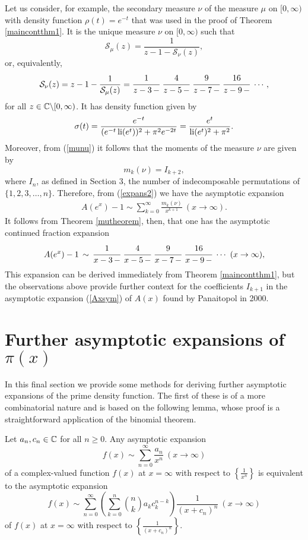 \documentclass[12pt]{article}
\begin{document}
Let us consider, for example, the secondary measure $\nu$ of the measure $\mu$ on $[0,\infty)$ with density function $\rho(t) = e^{-t}$ that was used in the proof of Theorem \ref{maincontthm1}.  It is the unique measure $\nu$ on $[0,\infty)$ such that
$${\mathcal S}_\mu(z) = \frac{1}{z-1 - {\mathcal S}_\nu(z)},$$
or, equivalently,
$${\mathcal S}_\nu(z)  = z - 1 - \frac{1}{{\mathcal S}_\mu(z)} =  \cfrac{1}{z-3 \,-} \  \cfrac{4}{z-5 \,-}\  \cfrac{9}{z-7 \,-}\  \cfrac{16}{z-9 \,-} \  \cdots,$$ 
for all $z \in {\mathbb C}\backslash [0,\infty)$.  It has density function given by
$$\sigma(t) = \frac{e^{-t}}{(e^{-t}\operatorname{li}(e^t))^2+\pi^2e^{-2t}} = \frac{e^t}{\operatorname{li}(e^t)^2+\pi^2}.$$
 Moreover, from (\ref{munu}) it follows that the moments of the measure $\nu$ are given by
$$m_k(\nu) = I_{k+2},$$
where $I_n$, as defined in Section 3, the number of indecomposable permutations of $\{1,2,3,\ldots,n\}$.  
Therefore, from (\ref{expans2}) we have the asymptotic expansion
\begin{align*}
A(e^x) - 1  \sim \sum_{k = 0}^\infty {\frac {m_{k}(\nu)}{x^{k+1}}} \ (x \to \infty).
\end{align*}
It follows from Theorem \ref{mutheorem}, then, that one has the asymptotic continued fraction expansion
\begin{align*}
A(e^x) - 1 \, \sim \,  \cfrac{1}{x-3 \,-} \  \cfrac{4}{x-5 \,-}\  \cfrac{9}{x-7 \,-}\  \cfrac{16}{x-9 \,-} \ \cdots \ (x \to \infty),
\end{align*}
This expansion can be derived immediately from Theorem \ref{maincontthm1}, but the observations above provide further context for the coefficients $I_{k+1}$ in the asymptotic expansion  (\ref{Axsym}) of $A(x)$ found by Panaitopol in 2000.

\section{Further asymptotic expansions of $\pi(x)$}

In this final section we provide some methods for deriving further asymptotic expansions of the prime density function.  The first of these is of a more combinatorial nature and is based on the following lemma, whose proof is a straightforward application of the binomial theorem.

\begin{lemma}\label{asympprop2b}
Let $a_n, c_n \in {\mathbb C}$ for all $n \geq 0$.  Any asymptotic expansion  
$$f(x) \sim \sum_{n = 0}^\infty \frac{a_n}{x^n} \ (x \to \infty)$$
of a complex-valued function $f(x)$ at $x = \infty$ with respect to $\left\{\frac{1}{x^n} \right\}$
is equivalent to the asymptotic expansion
$$f(x) \sim \sum_{n = 0}^\infty \left( \sum_{k = 0}^n {n \choose k} a_k c_k^{n-k} \right) \! \frac{1}{(x+c_n)^n} \ (x \to \infty)$$
of $f(x)$ at $x = \infty$ with respect to $\left\{\frac{1}{(x+c_n)^n} \right\}$.
\end{lemma}
\end{document}
